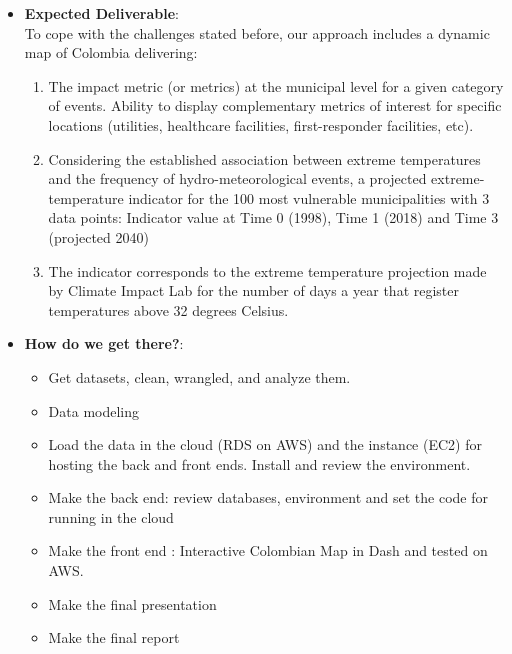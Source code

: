 \documentclass[11pt]{article}
\begin{document}
\begin{itemize}
\item \textbf{Expected Deliverable}:\\
To cope with the challenges stated before, our approach includes a dynamic map of Colombia delivering:

\begin{enumerate}
\item The impact metric (or metrics) at the municipal level for a given category of events. Ability to display complementary metrics of interest for specific locations (utilities, healthcare facilities, first-responder facilities, etc).
\item Considering the established association between extreme temperatures and the frequency of hydro-meteorological events, a projected extreme-temperature indicator for the 100 most vulnerable municipalities with 3 data points: Indicator value at Time 0 (1998), Time 1 (2018) and Time 3 (projected 2040)
\item The indicator corresponds to the extreme temperature projection made by Climate Impact Lab for the number of days a year that register temperatures above 32 degrees Celsius.
\end{enumerate}




\item \textbf{How do we get there?}:

\begin{itemize}
\item Get datasets, clean, wrangled, and analyze them.
\item Data modeling
\item Load the data in the cloud (RDS on AWS) and the instance (EC2) for hosting the back and front ends. Install and review the environment.
\item Make the back end: review databases, environment and set the code for running in the cloud
\item Make the front end : Interactive Colombian Map in Dash and tested on AWS.
\item Make the final presentation
\item Make the final report
\end{itemize}

\end{itemize}

%
%




\end{document}
